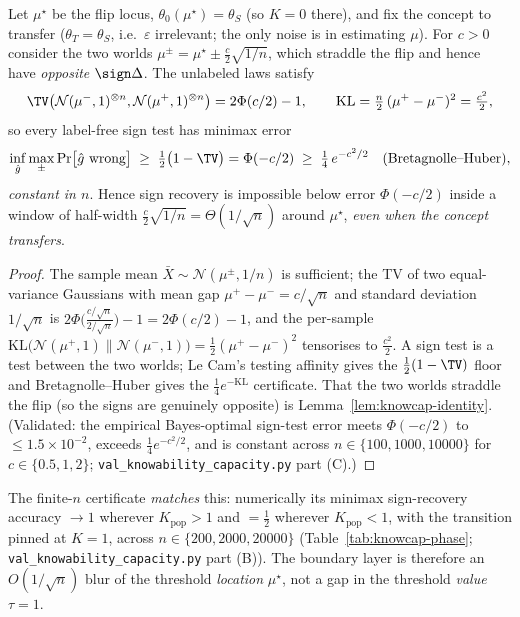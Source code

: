 \begin{proposition}\label{prop:knowcap-finiten}
Let $\mu^\star$ be the flip locus, $\theta_0(\mu^\star)=\theta_S$ (so $K=0$ there),
and fix the concept to transfer ($\theta_T=\theta_S$, i.e.\ $\varepsilon$ irrelevant;
the only noise is in estimating $\mu$). For $c>0$ consider the two worlds
$\mu^\pm=\mu^\star\pm\tfrac{c}{2}\sqrt{1/n}$, which straddle the flip and hence have
\emph{opposite} $\sign\Delta$. The unlabeled laws satisfy
\[
  \TV\big(\mathcal N(\mu^-,1)^{\otimes n},\mathcal N(\mu^+,1)^{\otimes n}\big)=2\Phi(c/2)-1,
  \qquad
  \mathrm{KL}=\tfrac{n}{2}\,(\mu^+-\mu^-)^2=\tfrac{c^2}{2},
\]
so every label-free sign test has minimax error
\[
  \inf_{\hat g}\max_{\pm}\Pr\!\big[\hat g\ \text{wrong}\big]
  \;\ge\;\tfrac12\big(1-\TV\big)=\Phi(-c/2)
  \;\ge\;\tfrac14\,e^{-c^2/2}\quad(\text{Bretagnolle--Huber}),
\]
\emph{constant in $n$}. Hence sign recovery is impossible below error $\Phi(-c/2)$
inside a window of half-width $\tfrac{c}{2}\sqrt{1/n}=\Theta(1/\sqrt n)$ around
$\mu^\star$, \emph{even when the concept transfers}.
\end{proposition}
\begin{proof}
The sample mean $\bar X\sim\mathcal N(\mu^\pm,1/n)$ is sufficient; the TV of two
equal-variance Gaussians with mean gap $\mu^+-\mu^-=c/\sqrt n$ and standard
deviation $1/\sqrt n$ is $2\Phi\big(\tfrac{c/\sqrt n}{2/\sqrt n}\big)-1=2\Phi(c/2)-1$,
and the per-sample $\mathrm{KL}\big(\mathcal N(\mu^+,1)\|\mathcal N(\mu^-,1)\big)=\tfrac12(\mu^+-\mu^-)^2$
tensorises to $\tfrac{c^2}{2}$. A sign test is a test between the two worlds; Le
Cam's testing affinity gives the $\tfrac12(1-\TV)$ floor and Bretagnolle--Huber
gives the $\tfrac14 e^{-\mathrm{KL}}$ certificate. That the two worlds straddle the
flip (so the signs are genuinely opposite) is Lemma~\ref{lem:knowcap-identity}.
(Validated: the empirical Bayes-optimal sign-test error meets $\Phi(-c/2)$ to
$\le1.5\times10^{-2}$, exceeds $\tfrac14 e^{-c^2/2}$, and is constant across
$n\in\{100,1000,10000\}$ for $c\in\{0.5,1,2\}$;
\texttt{val\_knowability\_capacity.py} part (C).)
\end{proof}

\noindent The finite-$n$ certificate \emph{matches} this: numerically its minimax
sign-recovery accuracy $\to1$ wherever $K_{\mathrm{pop}}>1$ and $=\tfrac12$ wherever
$K_{\mathrm{pop}}<1$, with the transition pinned at $K=1$, across
$n\in\{200,2000,20000\}$ (Table~\ref{tab:knowcap-phase};
\texttt{val\_knowability\_capacity.py} part (B)). The boundary layer is therefore an
$O(1/\sqrt n)$ blur of the threshold \emph{location} $\mu^\star$, not a gap in the
threshold \emph{value} $\tau=1$.

